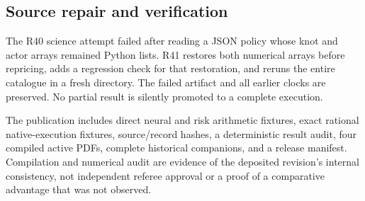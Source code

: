 \documentclass[
  11pt,
]{article}
\begin{document}
\hypertarget{source-repair-and-verification}{%
\subsection{Source repair and
verification}\label{source-repair-and-verification}}

The R40 science attempt failed after reading a JSON policy whose knot
and actor arrays remained Python lists. R41 restores both numerical
arrays before repricing, adds a regression check for that restoration,
and reruns the entire catalogue in a fresh directory. The failed
artifact and all earlier clocks are preserved. No partial result is
silently promoted to a complete execution.

The publication includes direct neural and risk arithmetic fixtures,
exact rational native-execution fixtures, source/record hashes, a
deterministic result audit, four compiled active PDFs, complete
historical companions, and a release manifest. Compilation and numerical
audit are evidence of the deposited revision's internal consistency, not
independent referee approval or a proof of a comparative advantage that
was not observed.
\end{document}
